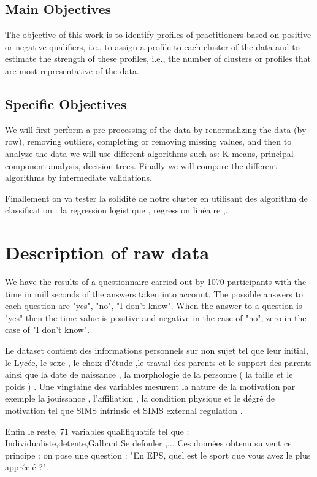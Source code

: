 \documentclass[12pt]{article}
\begin{document}
\subsection{Main Objectives}

The objective of this work is to identify profiles of practitioners based on positive or negative qualifiers, i.e., to assign a profile to each cluster of the data and to estimate the strength of these profiles, i.e., the number of clusters or profiles that are most representative of the data.

\subsection{Specific Objectives}
We will first perform a pre-processing of the data by renormalizing the data (by row), removing outliers, completing or removing missing values, and then to analyze the data we will use different algorithms such as: K-means, principal component analysis, decision trees. Finally we will compare the different algorithms by intermediate validations. 

Finallement on va tester la solidité de notre cluster en utilisant des algorithm de classification : la regression logistique , regression linéaire ,..



\section{Description of raw data}
We have the results of a questionnaire carried out by 1070 participants with the time in milliseconds of the answers taken into account. The possible answers to each question are "yes", "no", "I don't know". When the answer to a question is "yes" then the time value is positive and negative in the case of "no", zero in the case of "I don't know".


Le dataset contient des informations personnels sur non sujet tel  que leur initial, le Lycée, le sexe , le choix d'étude ,le travail des parents et le support des parents ainsi que la date de naissance , la  morphologie de la personne ( la taille et le poids ) . Une vingtaine des  variables mesurent la nature de la motivation par exemple la jouissance , l'affiliation , la condition physique  et  le dégré de motivation tel que SIMS intrinsic et SIMS external regulation . 

Enfin le  reste, 71 variables  qualifiquatifs tel que : Individualiste,detente,Galbant,Se defouler ,...
Ces données obtenu suivent ce principe :
on pose une question : "En EPS, quel est le sport que vous avez le plus apprécié ?".
\end{document}
